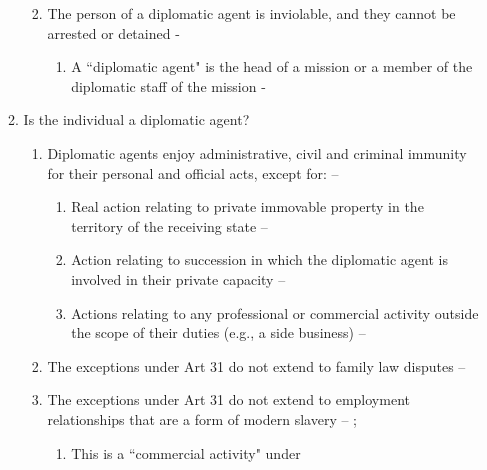 \begin{enumerate}
\begin{enumerate}
\begin{enumerate}
\begin{enumerate}
            \end{enumerate}
            \item The person of a diplomatic agent is inviolable, and they cannot be arrested or detained - 
            \begin{enumerate}
                \item A ``diplomatic agent" is the head of a mission or a member of the diplomatic staff of the mission - 
            \end{enumerate}
        \end{enumerate}
        \item Is the individual a diplomatic agent?
        \begin{enumerate}
            \item Diplomatic agents enjoy administrative, civil and criminal immunity for their personal and official acts, except for: -- 
            \begin{enumerate}
                \item Real action relating to private immovable property in the territory of the receiving state -- 
                \item Action relating to succession in which the diplomatic agent is involved in their private capacity -- 
                \item Actions relating to any professional or commercial activity outside the scope of their duties (e.g., a side business) -- 
            \end{enumerate}
            \item The exceptions under Art 31 do not extend to family law disputes -- 
            \item The exceptions under Art 31 do not extend to employment relationships that are a form of modern slavery -- ; 
            \begin{enumerate}
                \item This is a ``commercial activity" under 

\end{enumerate}
\end{enumerate}
\end{enumerate}
\end{enumerate}
